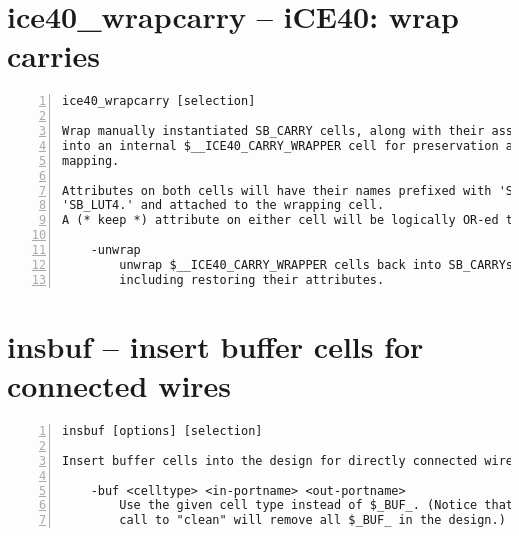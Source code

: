 \section{ice40\_wrapcarry -- iCE40: wrap carries}
\label{cmd:ice40_wrapcarry}
\begin{lstlisting}[numbers=left,frame=single]
    ice40_wrapcarry [selection]

Wrap manually instantiated SB_CARRY cells, along with their associated SB_LUT4s,
into an internal $__ICE40_CARRY_WRAPPER cell for preservation across technology
mapping.

Attributes on both cells will have their names prefixed with 'SB_CARRY.' or
'SB_LUT4.' and attached to the wrapping cell.
A (* keep *) attribute on either cell will be logically OR-ed together.

    -unwrap
        unwrap $__ICE40_CARRY_WRAPPER cells back into SB_CARRYs and SB_LUT4s,
        including restoring their attributes.
\end{lstlisting}

\section{insbuf -- insert buffer cells for connected wires}
\label{cmd:insbuf}
\begin{lstlisting}[numbers=left,frame=single]
    insbuf [options] [selection]

Insert buffer cells into the design for directly connected wires.

    -buf <celltype> <in-portname> <out-portname>
        Use the given cell type instead of $_BUF_. (Notice that the next
        call to "clean" will remove all $_BUF_ in the design.)
\end{lstlisting}

